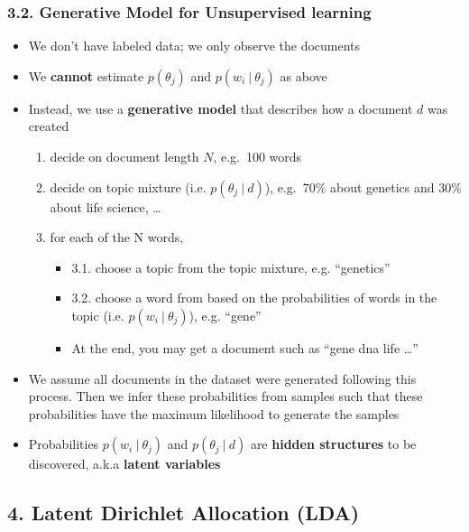 \documentclass[11pt]{article}
\providecommand{\tightlist}{%
      \setlength{\itemsep}{0pt}\setlength{\parskip}{0pt}}
\begin{document}
    \hypertarget{generative-model-for-unsupervised-learning}{%
\subsubsection{3.2. Generative Model for Unsupervised
learning}\label{generative-model-for-unsupervised-learning}}

\begin{itemize}
\tightlist
\item
  We don't have labeled data; we only observe the documents
\item
  We \textbf{cannot} estimate \(p(\theta_j)\) and \(p(w_i~|~\theta_j)\)
  as above
\item
  Instead, we use a \textbf{generative model} that describes how a
  document \(d\) was created

  \begin{enumerate}
  \def\labelenumi{\arabic{enumi}.}
  \tightlist
  \item
    decide on document length \(N\), e.g.~100 words
  \item
    decide on topic mixture (i.e. \(p(\theta_j~|~d)\)), e.g.~70\% about
    genetics and 30\% about life science, \ldots{}
  \item
    for each of the N words,

    \begin{itemize}
    \tightlist
    \item
      3.1. choose a topic from the topic mixture, e.g. ``genetics''
    \item
      3.2. choose a word from based on the probabilities of words in the
      topic (i.e. \(p(w_i~|~\theta_j)\)), e.g. ``gene''
    \item
      At the end, you may get a document such as ``gene dna life
      \ldots{}''
    \end{itemize}
  \end{enumerate}
\item
  We assume all documents in the dataset were generated following this
  process. Then we infer these probabilities from samples such that
  these probabilities have the maximum likelihood to generate the
  samples
\item
  Probabilities \(p(w_i~|~\theta_j)\) and \(p(\theta_j~|~d)\) are
  \textbf{hidden structures} to be discovered, a.k.a \textbf{latent
  variables} 
\end{itemize}

    \hypertarget{latent-dirichlet-allocation-lda}{%
\subsection{4. Latent Dirichlet Allocation
(LDA)}\label{latent-dirichlet-allocation-lda}}
\end{document}
